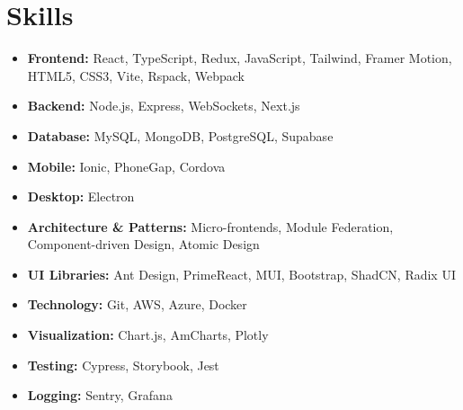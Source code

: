 \documentclass[]{resume-openfont}
\begin{document}
\section{Skills}
\begin{multicols}{2}
\begin{itemize}[leftmargin=*, itemsep=2pt, parsep=0pt, topsep=2pt]
  \item \textbf{Frontend:} React, TypeScript, Redux, JavaScript, Tailwind, Framer Motion, HTML5, CSS3, Vite, Rspack, Webpack
  \item \textbf{Backend:} Node.js, Express, WebSockets, Next.js
  \item \textbf{Database:} MySQL, MongoDB, PostgreSQL, Supabase
  \item \textbf{Mobile:} Ionic, PhoneGap, Cordova
  \item \textbf{Desktop:} Electron
  \item \textbf{Architecture \& Patterns:} Micro-frontends, Module Federation, Component-driven Design, Atomic Design
  \item \textbf{UI Libraries:} Ant Design, PrimeReact, MUI, Bootstrap, ShadCN, Radix UI
  \item \textbf{Technology:} Git, AWS, Azure, Docker
  \item \textbf{Visualization:} Chart.js, AmCharts, Plotly
  \item \textbf{Testing:} Cypress, Storybook, Jest
  \item \textbf{Logging:} Sentry, Grafana
\end{itemize}
\end{multicols}

\end{document}
